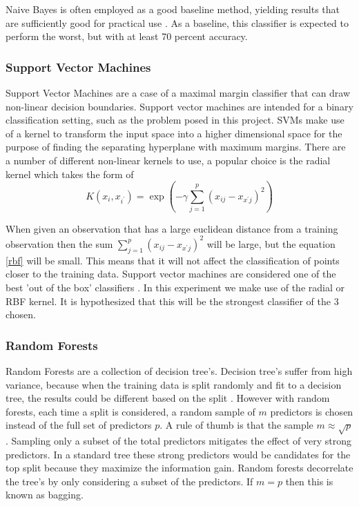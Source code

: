 \documentclass[10pt,letterpaper]{article}
\begin{document}
	Naive Bayes is often employed as a good baseline method, yielding results that are sufficiently good for practical use \cite{jurafsky}. As a baseline, this classifier is expected to perform the worst, but with at least 70 percent accuracy.
	
	\subsubsection*{Support Vector Machines}
	
	Support Vector Machines are a case of a maximal margin classifier that can draw non-linear decision boundaries. Support vector machines are intended for a binary classification setting, such as the problem posed in this project. SVMs make use of a kernel to transform the input space into a higher dimensional space for the purpose of finding the separating hyperplane with maximum margins. There are a number of different non-linear kernels to use, a popular choice is the radial kernel \cite{yellowbook} which takes the form of 
	\begin{equation}
	\label{rbf}
	K(x_i, x_{i^\prime}) = \exp({-\gamma \sum_{j=1}^{p}({x_{ij}-x_{x^\prime j}})^2})
	\end{equation}
	
	When given an observation that has a large euclidean distance from a training observation then the sum $\sum_{j=1}^{p}({x_{ij}-x_{x^\prime j}})^2$ will be large, but the equation \ref{rbf} will be small. This means that it will not affect the classification of points closer to the training data. Support vector machines are considered one of the best 'out of the box' classifiers \cite{yellowbook}. In this experiment we make use of the radial or RBF kernel. It is hypothesized that this will be the strongest classifier of the 3 chosen. 
	
	\subsubsection*{Random Forests}
	Random Forests are a collection of decision tree's. Decision tree's suffer from high variance, because when the training data is split randomly and fit to a decision tree, the results could be different based on the split \cite{yellowbook}. However with random forests, each time a split is considered, a random sample of $m$ predictors is chosen instead of the full set of predictors $p$. A rule of thumb is that the sample $m \approx \sqrt{p}$ \cite{yellowbook}. Sampling only a subset of the total predictors mitigates the effect of very strong predictors. In a standard tree these strong predictors would be candidates for the top split because they maximize the information gain. Random forests decorrelate the tree's by only considering a subset of the predictors. If $m=p$ then this is known as bagging.
	
\end{document}
